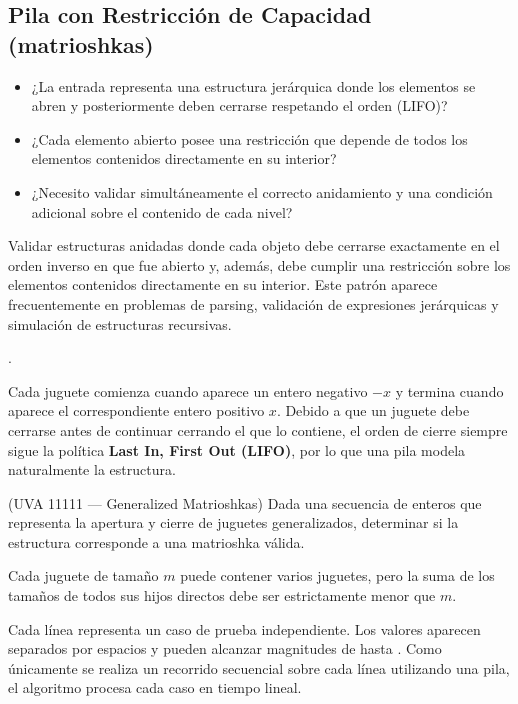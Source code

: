 \subsection{Pila con Restricción de Capacidad (matrioshkas)}
\label{alg:3-11}


\begin{itemize}
\item ¿La entrada representa una estructura jerárquica donde los elementos se abren y posteriormente deben cerrarse respetando el orden (LIFO)?
\item ¿Cada elemento abierto posee una restricción que depende de todos los elementos contenidos directamente en su interior?
\item ¿Necesito validar simultáneamente el correcto anidamiento y una condición adicional sobre el contenido de cada nivel?
\end{itemize}

 Validar estructuras anidadas donde cada objeto debe cerrarse exactamente en el orden inverso en que fue abierto y, además, debe cumplir una restricción sobre los elementos contenidos directamente en su interior. Este patrón aparece frecuentemente en problemas de parsing, validación de expresiones jerárquicas y simulación de estructuras recursivas.

 .

 Cada juguete comienza cuando aparece un entero negativo $-x$ y termina cuando aparece el correspondiente entero positivo $x$. Debido a que un juguete debe cerrarse antes de continuar cerrando el que lo contiene, el orden de cierre siempre sigue la política \textbf{Last In, First Out (LIFO)}, por lo que una pila modela naturalmente la estructura.


(UVA 11111 — Generalized Matrioshkas) Dada una secuencia de enteros que representa la apertura y cierre de juguetes generalizados, determinar si la estructura corresponde a una matrioshka válida.

Cada juguete de tamaño $m$ puede contener varios juguetes, pero la suma de los tamaños de todos sus hijos directos debe ser estrictamente menor que $m$.

 Cada línea representa un caso de prueba independiente. Los valores aparecen separados por espacios y pueden alcanzar magnitudes de hasta . Como únicamente se realiza un recorrido secuencial sobre cada línea utilizando una pila, el algoritmo procesa cada caso en tiempo lineal.

